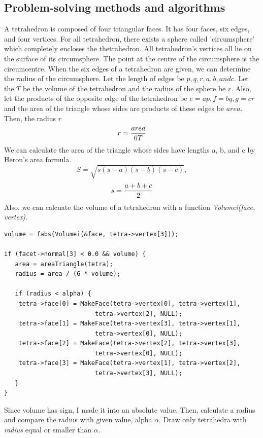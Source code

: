 \documentclass[11pt]{article}
\begin{document}
\clearpage

\subsection{Problem-solving methods and algorithms}
A tetrahedron is composed of four triangular faces. It has four faces, six edges, and four vertices. For all tetrahedron, there exists a sphere called 'circumsphere' which completely encloses the thetrahedron. All tetrahedron's vertices all lie on the surface of its circumsphere. The point at the centre of the circumsphere is the circumcentre. When the six edges of a tetrahedron are given, we can determine the radius of the circumsphere. Let the length of edges be $p, q, r, a, b, and c$. Let the $T$ be the volume of the tetrahedron and the radius of the sphere be $r$. Also, let the products of the opposite edge of the tetrahedron be $e = ap, f=bq, g = cr$ and the area of the triangle whose sides are products of these edges be $area$. Then, the radius $r$
\begin{equation*}
r = {area\over 6T}
\end{equation*}
We can calculate the area of the triangle whose sides have lengths a, b, and c by Heron's area formula.
\begin{equation*}
S = \sqrt{s(s-a)(s-b)(s-c)},
\end{equation*}
\begin{equation*}
s = {a + b + c \over 2}
\end{equation*}
Also, we can calcuate the volume of a tetrahedron with a function \textit{ Volumei(face, vertex)}.

\begin{lstlisting}
volume = fabs(Volumei(&face, tetra->vertex[3]));
	
if (facet->normal[3] < 0.0 && volume) {
   area = areaTriangle(tetra);
   radius = area / (6 * volume);
		
   if (radius < alpha) {
	tetra->face[0] = MakeFace(tetra->vertex[0], tetra->vertex[1],
						 tetra->vertex[2], NULL);
	tetra->face[1] = MakeFace(tetra->vertex[3], tetra->vertex[1],
						 tetra->vertex[0], NULL);
	tetra->face[2] = MakeFace(tetra->vertex[2], tetra->vertex[3],
						 tetra->vertex[0], NULL);
	tetra->face[3] = MakeFace(tetra->vertex[1], tetra->vertex[2],
						 tetra->vertex[3], NULL);
   }
}

\end{lstlisting}
Since volume has sign, I made it into an absolute value. Then, calculate a radius and compare the radius with given value, alpha $\alpha$. Draw only tetrahedra with \textit{radius} equal or smaller than $\alpha$.
\end{document}
